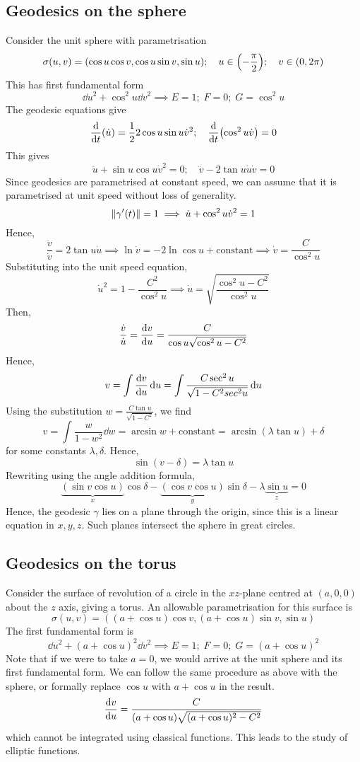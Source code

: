 \subsection{Geodesics on the sphere}
Consider the unit sphere with parametrisation
\[ \sigma(u,v) = (\cos u \cos v, \cos u \sin v, \sin u);\quad u \in \qty(-\frac{\pi}{2});\quad v \in \qty(0, 2 \pi) \]
This has first fundamental form
\[ \dd{u}^2 + \cos^2 u \dd{v}^2 \implies E = 1;\; F = 0;\; G = \cos^2 u \]
The geodesic equations give
\[ \dv{t} \qty(\dot u) = \frac{1}{2} 2\cos u \sin u \dot v^2;\quad \dv{t} \qty(\cos^2 u \dot v) = 0 \]
This gives
\[ \ddot u + \sin u \cos u \dot v^2 = 0;\quad \ddot v - 2 \tan u \dot u \dot v = 0 \]
Since geodesics are parametrised at constant speed, we can assume that it is parametrised at unit speed without loss of generality.
\[ \norm{\gamma'(t)} = 1 \implies \dot u + \cos^2 u \dot v^2 = 1 \]
Hence,
\[ \frac{\ddot v}{\dot v} = 2 \tan u \dot u \implies \ln \dot v = -2 \ln \cos u + \text{constant} \implies \dot v = \frac{C}{\cos^2 u} \]
Substituting into the unit speed equation,
\[ \dot u^2 = 1 - \frac{C^2}{\cos^2 u} \implies \dot u = \sqrt{\frac{\cos^2 u - C^2}{\cos^2 u}} \]
Then,
\[ \frac{\dot v}{\dot u} = \dv{v}{u} = \frac{C}{\cos u \sqrt{\cos^2 u - C^2}} \]
Hence,
\[ v = \int \dv{v}{u} \dd{u} = \int \frac{C \sec^2 u}{\sqrt{1-C^2 sec^2 u}} \dd{u} \]
Using the substitution \( w = \frac{C \tan u}{\sqrt{1-C^2}} \), we find
\[ v = \int \frac{w}{1-w^2} \dd{w} = \arcsin w + \text{constant} = \arcsin(\lambda \tan u) + \delta \]
for some constants \( \lambda, \delta \).
Hence,
\[ \sin (v - \delta) = \lambda \tan u \]
Rewriting using the angle addition formula,
\[ \underbrace{(\sin v \cos u)}_{x}\cos \delta - \underbrace{(\cos v \cos u)}_{y}\sin \delta - \lambda \underbrace{\sin u}_z = 0 \]
Hence, the geodesic \( \gamma \) lies on a plane through the origin, since this is a linear equation in \( x, y, z \).
Such planes intersect the sphere in great circles.

\subsection{Geodesics on the torus}
Consider the surface of revolution of a circle in the \( xz \)-plane centred at \( (a,0,0) \) about the \( z \) axis, giving a torus.
An allowable parametrisation for this surface is
\[ \sigma(u,v) = ((a+\cos u)\cos v, (a+\cos u)\sin v, \sin u) \]
The first fundamental form is
\[ \dd{u}^2 + (a+\cos u)^2 \dd{v}^2 \implies E = 1;\;F = 0;\;G = (a+\cos u)^2 \]
Note that if we were to take \( a = 0 \), we would arrive at the unit sphere and its first fundamental form.
We can follow the same procedure as above with the sphere, or formally replace \( \cos u \) with \( a+\cos u \) in the result.
\[ \dv{v}{u} = \frac{C}{(a+\cos u)\sqrt{(a+\cos u)^2 - C^2}} \]
which cannot be integrated using classical functions.
This leads to the study of elliptic functions.

